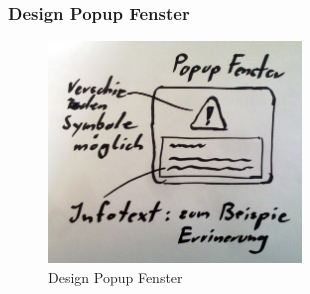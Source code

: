 \begin{frame}
	\frametitle{Design Popup Fenster}
%
	\begin{figure}
		\centering
		\includegraphics[width = 0.6\textwidth]{../grafiken/popup-fenster}
		\caption{Design Popup Fenster}
	\end{figure}
\end{frame}
%
%
%
